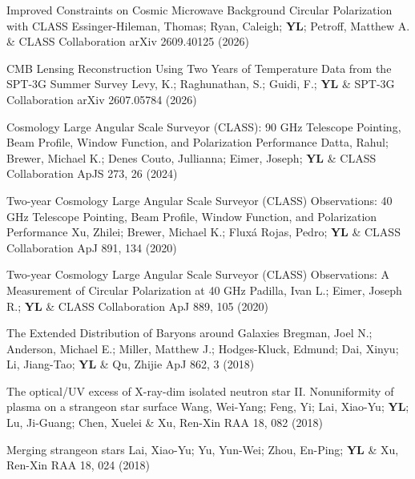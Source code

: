\begin{etaremune}[topsep=0pt,itemsep=0pt,partopsep=0pt,parsep=0pt]
    \renewcommand\labelenumi{\footnotesize\bfseries\theenumi.}

            {Improved Constraints on Cosmic Microwave Background Circular Polarization with CLASS}
            {Essinger-Hileman, Thomas; Ryan, Caleigh; \textbf{YL}; Petroff, Matthew A. \& CLASS Collaboration}
            {arXiv 2609.40125 (2026)}

            {CMB Lensing Reconstruction Using Two Years of Temperature Data from the SPT-3G Summer Survey}
            {Levy, K.; Raghunathan, S.; Guidi, F.; \textbf{YL} \& SPT-3G Collaboration}
            {arXiv 2607.05784 (2026)}

            {Cosmology Large Angular Scale Surveyor (CLASS): 90 GHz Telescope Pointing, Beam Profile, Window Function, and Polarization Performance}
            {Datta, Rahul; Brewer, Michael K.; Denes Couto, Jullianna; Eimer, Joseph; \textbf{YL} \& CLASS Collaboration}
            {ApJS 273, 26 (2024)}

            {Two-year Cosmology Large Angular Scale Surveyor (CLASS) Observations: 40 GHz Telescope Pointing, Beam Profile, Window Function, and Polarization Performance}
            {Xu, Zhilei; Brewer, Michael K.; Fluxá Rojas, Pedro; \textbf{YL} \& CLASS Collaboration}
            {ApJ 891, 134 (2020)}

            {Two-year Cosmology Large Angular Scale Surveyor (CLASS) Observations: A Measurement of Circular Polarization at 40 GHz}
            {Padilla, Ivan L.; Eimer, Joseph R.; \textbf{YL} \& CLASS Collaboration}
            {ApJ 889, 105 (2020)}

            {The Extended Distribution of Baryons around Galaxies}
            {Bregman, Joel N.; Anderson, Michael E.; Miller, Matthew J.; Hodges-Kluck, Edmund; Dai, Xinyu; Li, Jiang-Tao; \textbf{YL} \& Qu, Zhijie}
            {ApJ 862, 3 (2018)}

            {The optical/UV excess of X-ray-dim isolated neutron star II. Nonuniformity of plasma on a strangeon star surface}
            {Wang, Wei-Yang; Feng, Yi; Lai, Xiao-Yu; \textbf{YL}; Lu, Ji-Guang; Chen, Xuelei \& Xu, Ren-Xin}
            {RAA 18, 082 (2018)}

            {Merging strangeon stars}
            {Lai, Xiao-Yu; Yu, Yun-Wei; Zhou, En-Ping; \textbf{YL} \& Xu, Ren-Xin}
            {RAA 18, 024 (2018)}

\end{etaremune}
